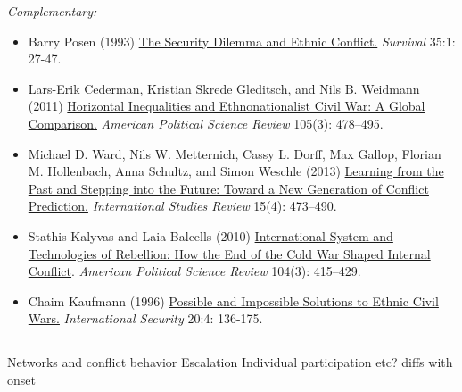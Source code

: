 \documentclass[12pt, a4paper]{article}
\begin{document}
\noindent\textit{Complementary:}

\begin{itemize}
  \item Barry Posen (1993) \href{https://doi.org/10.1080/00396339308442672}{The Security Dilemma and Ethnic Conflict.} \textit{Survival} 35:1: 27-47.
  \item Lars-Erik Cederman, Kristian Skrede Gleditsch, and Nils B. Weidmann (2011) \href{https://doi.org/10.1017/S0003055411000207}{Horizontal Inequalities and Ethnonationalist Civil War: A Global Comparison.} \textit{American Political Science Review} 105(3): 478--495.
  \item Michael D. Ward, Nils W. Metternich, Cassy L. Dorff, Max Gallop, Florian M. Hollenbach, Anna Schultz, and Simon Weschle (2013) \href{https://doi.org/10.1111/misr.12072}{Learning from the Past and Stepping into the Future: Toward a New Generation of Conflict Prediction.} \textit{International Studies Review} 15(4): 473--490.
  \item Stathis Kalyvas and Laia Balcells (2010) \href{https://doi.org/10.1017/S0003055410000286}{International System and Technologies of Rebellion: How the End of the Cold War Shaped Internal Conflict}. \textit{American Political Science Review} 104(3): 415--429.
	\item Chaim Kaufmann (1996) \href{https://doi.org/10.1162/isec.20.4.136}{Possible and Impossible Solutions to Ethnic Civil Wars.} \textit{International Security} 20:4: 136-175.
\end{itemize}

\vspace{20pt}
\hline
\subsection*{{\color{red}{Session extra: Disaggregating internal conflict}}}


Networks and conflict behavior
Escalation
Individual participation
etc?
diffs with onset
\end{document}
